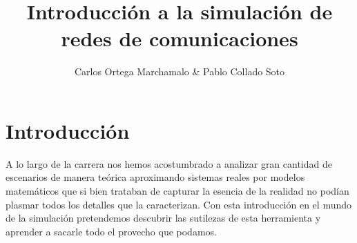 \documentclass{article}[10pt]
\title{Introducción a la simulación de redes de comunicaciones}
\author{Carlos Ortega Marchamalo \& Pablo Collado Soto}
\date{}
\begin{document}
	\begin{titlepage}
		\maketitle
	\end{titlepage}

	\newpage
	\tableofcontents
	\newpage

	\section{Introducción}
		A lo largo de la carrera nos hemos acostumbrado a analizar gran cantidad de escenarios de manera teórica aproximando sistemas reales por modelos matemáticos que si bien trataban de capturar la esencia de la realidad no podían plasmar todos los detalles que la caracterizan. Con esta introducción en el mundo de la simulación pretendemos descubrir las sutilezas de esta herramienta y aprender a sacarle todo el provecho que podamos.
\end{document}
